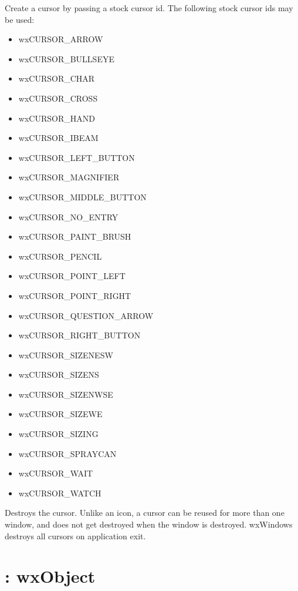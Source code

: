 
Create a cursor by passing a stock cursor id.
The following stock cursor ids may be used:

\begin{itemize}\itemsep=0pt
\item wxCURSOR\_ARROW
\item wxCURSOR\_BULLSEYE
\item wxCURSOR\_CHAR
\item wxCURSOR\_CROSS
\item wxCURSOR\_HAND
\item wxCURSOR\_IBEAM
\item wxCURSOR\_LEFT\_BUTTON
\item wxCURSOR\_MAGNIFIER
\item wxCURSOR\_MIDDLE\_BUTTON
\item wxCURSOR\_NO\_ENTRY
\item wxCURSOR\_PAINT\_BRUSH
\item wxCURSOR\_PENCIL
\item wxCURSOR\_POINT\_LEFT
\item wxCURSOR\_POINT\_RIGHT
\item wxCURSOR\_QUESTION\_ARROW
\item wxCURSOR\_RIGHT\_BUTTON
\item wxCURSOR\_SIZENESW
\item wxCURSOR\_SIZENS
\item wxCURSOR\_SIZENWSE
\item wxCURSOR\_SIZEWE
\item wxCURSOR\_SIZING
\item wxCURSOR\_SPRAYCAN
\item wxCURSOR\_WAIT
\item wxCURSOR\_WATCH
\end{itemize}



Destroys the cursor. Unlike an icon, a cursor can be reused for more
than one window, and does not get destroyed when the window is
destroyed. wxWindows destroys all cursors on application exit.

\section{: wxObject}\label{wxdatabase}

